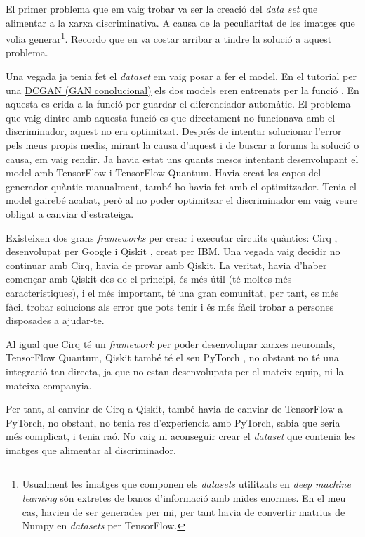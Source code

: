El primer problema que em vaig trobar va ser la creació del \textit{data set} que alimentar a la xarxa discriminativa. A causa de la peculiaritat de les imatges que volia generar\footnote{Usualment les imatges que componen els \textit{datasets} utilitzats en \textit{deep machine learning} són extretes de bancs d'informació amb mides enormes. En el meu cas, havien de ser generades per mi, per tant havia de convertir matrius de Numpy en \textit{datasets} per TensorFlow.}. Recordo que en va costar arribar a tindre la solució a aquest problema. 

Una vegada ja tenia fet el \textit{dataset} em vaig posar a fer el model. En el tutorial per una \href{https://www.tensorflow.org/tutorials/generative/dcgan}{DCGAN (GAN conolucional)} els dos models eren entrenats per la funció . En aquesta es crida a la funció  per guardar el diferenciador automàtic. El problema que vaig dintre amb aquesta funció es que directament no funcionava amb el discriminador, aquest no era optimitzat. Després de intentar solucionar l'error pels meus propis medis, mirant la causa d'aquest i de buscar a forums la solució o causa, em vaig rendir. Ja havia estat uns quants mesos intentant desenvolupant el model amb TensorFlow i TensorFlow Quantum. Havia creat les capes del generador quàntic manualment, també ho havia fet amb el optimitzador. Tenia el model gairebé acabat, però al no poder optimitzar el discriminador em vaig veure obligat a canviar d'estrateiga. 

Existeixen dos grans \textit{frameworks} per crear i executar circuits quàntics: Cirq \cite{cirq}, desenvolupat per Google i Qiskit \cite{qiskit}, creat per IBM. Una vegada vaig decidir no continuar amb Cirq, havia de provar amb Qiskit. La veritat, havia d'haber començar amb Qiskit des de el principi, és més útil (té moltes més característiques), i el més important, té una gran comunitat, per tant, es més fàcil trobar solucions als error que pots tenir i és més fàcil trobar a persones disposades a ajudar-te.

Al igual que Cirq té un \textit{framework} per poder desenvolupar xarxes neuronals, TensorFlow Quantum, Qiskit també té el seu PyTorch \cite{pytorch_2019}, no obstant no té una integració tan directa, ja que no estan desenvolupats per el mateix equip, ni la mateixa companyia. 

Per tant, al canviar de Cirq a Qiskit, també havia de canviar de TensorFlow a PyTorch, no obstant, no tenia res d'experiencia amb PyTorch, sabia que seria més complicat, i tenia raó. No vaig ni aconseguir crear el \textit{dataset} que contenia les imatges que alimentar al discriminador. 

